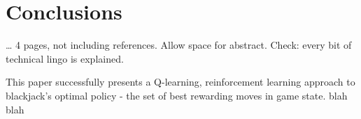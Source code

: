 \section{Conclusions}
\dots
4 pages, not including references. Allow space for abstract.
Check: every bit of technical lingo is explained. 

This paper successfully presents a Q-learning, reinforcement learning approach to blackjack's optimal policy - the set of best rewarding moves in game state. blah blah

